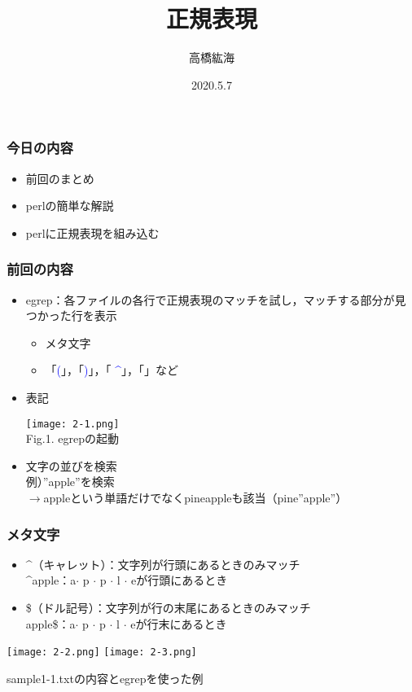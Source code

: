 \documentclass[dvipdfmx,11pt,notheorems]{beamer}
\title{正規表現}
\author{高橋紘海}
\date{2020.5.7}
\begin{document}
\begin{frame} %
\titlepage %
\end{frame} %

\begin{frame}
\frametitle{今日の内容}
\begin{itemize}
\item 前回のまとめ
\item perlの簡単な解説
\item perlに正規表現を組み込む
\end{itemize}
\end{frame} 


\begin{frame}
\frametitle{前回の内容}
\begin{itemize}
\item egrep：各ファイルの各行で正規表現のマッチを試し，マッチする部分が見つかった行を表示
\begin{itemize}
\item メタ文字
\item 「\textcolor{blue}{(}」，「\textcolor{blue}{)}」，「\textcolor{blue}{ \^{}}」，「\textcolor{blue}{\textbar}」など
\end{itemize}
\item 表記
\begin{center}
\texttt{[image: 2-1.png]}\\
Fig.1. egrepの起動
\end{center}
\item 文字の並びを検索\\
例）''apple''を検索\\
$\rightarrow$appleという単語だけでなくpineappleも該当（pine''apple''）
\end{itemize}
\end{frame}

\begin{frame}
\frametitle{メタ文字}
\begin{itemize}
\item \^{}（キャレット）：文字列が行頭にあるときのみマッチ\\
\^{}apple：a$\cdot$ p $\cdot$ p $\cdot$ l $\cdot$ eが行頭にあるとき
\item \$（ドル記号）：文字列が行の末尾にあるときのみマッチ\\
apple\$：a$\cdot$ p $\cdot$ p $\cdot$ l $\cdot$ eが行末にあるとき
\end{itemize}
\texttt{[image: 2-2.png]}
\texttt{[image: 2-3.png]}
\begin{center}
sample1-1.txtの内容とegrepを使った例
\end{center}
\end{frame}
\end{document}
